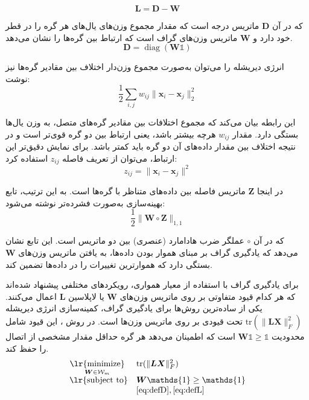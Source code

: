 \documentclass[12pt,onecolumn,a4paper]{article}
\newcommand\minimize[1]{\mathop{\text{\lr{minimize}}}\limits_{#1}\ }
\begin{document}
\begin{equation}\label{eq:defL}
	     \bm{L} = \bm{D} - \bm{W}
\end{equation}
     
     که در آن \( \bm{D} \) ماتریس درجه است که مقدار مجموع وزن‌های یال‌های هر گره را در قطر خود دارد و \( \bm{W} \) ماتریس وزن‌های گراف است که ارتباط بین گره‌ها را نشان می‌دهد.
     \begin{equation}\label{eq:defD}
     	\bm{D} = \operatorname{diag}(\bm{W}\mathds{1})
     \end{equation}
     
      انرژی دیریشله را می‌توان به‌صورت مجموع وزن‌دار اختلاف بین مقادیر گره‌ها نیز نوشت:
  \begin{equation}
  	     \frac{1}{2} \sum_{i,j} w_{ij} \|\bm{x}_i - \bm{x}_j\|_2^2
  \end{equation}
     
     این رابطه بیان می‌کند که مجموع اختلافات بین مقادیر گره‌های متصل، به وزن یال‌ها بستگی دارد. مقدار \( w_{ij} \) هرچه بیشتر باشد، یعنی ارتباط بین دو گره قوی‌تر است و در نتیجه اختلاف بین مقدار داده‌های آن دو گره باید کمتر باشد. برای نمایش دقیق‌تر این ارتباط، می‌توان از تعریف فاصله \( z_{ij} \) استفاده کرد:
\begin{equation}
	     z_{ij} = \|\bm{x}_i - \bm{x}_j\|^2
\end{equation}
     
     در اینجا \( \bm{Z} \) ماتریس فاصله بین داده‌های متناظر با گره‌ها است. به این ترتیب، تابع بهینه‌سازی به‌صورت فشرده‌تر نوشته می‌شود:
\begin{equation}
	     \frac{1}{2} \| \bm{W} \circ \bm{Z} \|_{1,1}
\end{equation}
     
     که در آن \( \circ \) عملگر ضرب هادامارد (عنصری) بین دو ماتریس است. این تابع نشان می‌دهد که یادگیری گراف بر مبنای هموار بودن داده‌ها، به یافتن ماتریس وزن‌های \( \bm{W} \) بستگی دارد که هموارترین تغییرات را در داده‌ها تضمین کند.
     
     برای یادگیری گراف با استفاده از معیار همواری، رویکردهای مختلفی پیشنهاد شده‌اند که هر کدام قیود متفاوتی بر روی ماتریس وزن‌های \( \bm{W} \) یا لاپلاسین \( \bm{L} \) اعمال می‌کنند. یکی از ساده‌ترین روش‌ها برای یادگیری گراف، کمینه‌سازی انرژی دیریشله \( \text{tr}(\|\bm{L} \bm{X}\|^2_F) \) تحت قیودی بر روی ماتریس وزن‌ها است.
     در روش \cite{Daitch2009}، این قیود شامل محدودیت \( \bm{W} \mathds{1} \geq \mathds{1} \) است که اطمینان می‌دهد هر گره حداقل مقدار مشخصی از اتصال را حفظ کند. 
     \begin{equation}
     		\begin{array}{cl}
     			\minimize{\bm{W}\in\mathcal{W}_m} & \text{tr}(\|\bm{L} \bm{X}\|^2_F) \\
     			\text{\lr{subject to}} & \bm{W} \mathds{1} \ge \mathds{1} \\
     			& \eqref{eq:defD}, \eqref{eq:defL}
     		\end{array}
     \end{equation}
     
\end{document}
